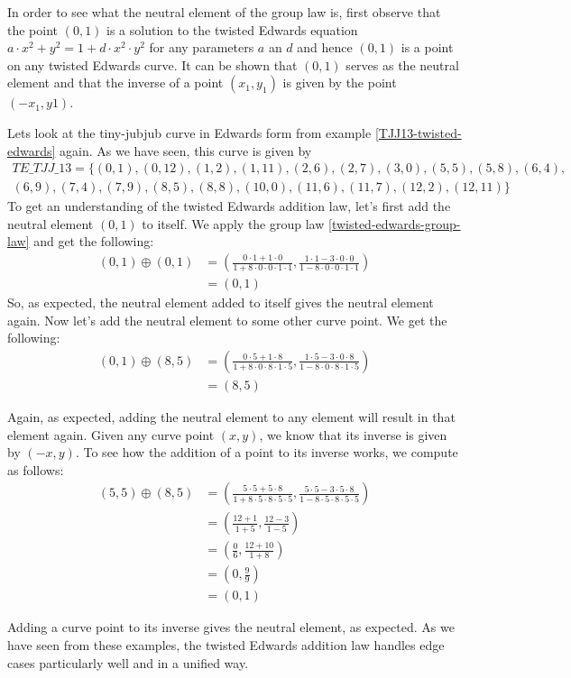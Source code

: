 In order to see what the neutral element of the group law is, first observe that the point $(0,1)$ is a solution to the twisted Edwards equation $a\cdot x^{2} + y^2 =1+ d\cdot x^{2}\cdot y^2$ for any parameters $a$ an $d$ and hence $(0,1)$ is a point on any twisted Edwards curve. It can be shown that $(0,1)$ serves as the neutral element and that the inverse of a point $(x_1, y_1)$ is given by the point $(-x_1, y1)$.
\begin{example}
\label{example:TETJJ13}
 Lets look at the tiny-jubjub curve in Edwards form from example \ref{TJJ13-twisted-edwards} again. As we have seen, this curve is given by
\begin{multline*}
\mathit{TE\_TJJ\_13} = \{(0, 1),(0, 12),(1, 2),(1, 11),(2, 6),(2, 7),(3, 0),(5, 5),(5, 8),(6, 4),\\
(6, 9),(7, 4),(7, 9),(8, 5),(8, 8),(10, 0),(11, 6),(11, 7),(12, 2),(12, 11)\}
\end{multline*}
To get an understanding of the twisted Edwards addition law, let's first add the neutral element $(0,1)$ to itself. We apply the group law \ref{twisted-edwards-group-law} and get the following:
\begin{align*}
(0, 1) \oplus (0, 1) &= \left(\frac{0\cdot 1+1 \cdot 0}{1 +8\cdot0\cdot 0\cdot 1\cdot 1},\frac{1\cdot 1-3\cdot 0\cdot 0}{1-8\cdot 0\cdot 0\cdot 1\cdot 1}\right)\\
                     & = (0,1)
\end{align*}
So, as expected, the neutral element added to itself gives the neutral element again. Now let's add the neutral element to some other curve point. We get the following:
\begin{align*}
(0, 1) \oplus (8, 5) &= \left(\frac{0\cdot 5+1 \cdot 8}{1 +8\cdot0\cdot 8\cdot 1\cdot 5},\frac{1\cdot 5 - 3\cdot 0\cdot 8}{1-8\cdot 0\cdot 8\cdot 1\cdot 5}\right)\\
                     & = (8,5)
\end{align*}

Again, as expected, adding the neutral element to any element will result in that element again. Given any curve point $(x,y)$, we know that its inverse is given by $(-x,y)$. To see how the addition of a point to its inverse works, we compute as follows:
\begin{align*}
(5, 5) \oplus (8, 5) &= \left(\frac{5\cdot 5+5 \cdot 8}{1 +8\cdot 5\cdot 8\cdot 5\cdot 5},\frac{5\cdot 5 - 3\cdot 5\cdot 8}{1-8\cdot 5\cdot 8\cdot 5\cdot 5}\right)\\
                     &= \left(\frac{12+1}{1 +5},\frac{12 - 3}{1-5}\right)\\
                     &= \left(\frac{0}{6},\frac{12 + 10}{1+8}\right)\\
                     &= \left(0,\frac{9}{9}\right)\\
                     &=  (0,1)
\end{align*}

Adding a curve point to its inverse gives the neutral element, as expected. As we have seen from these examples, the twisted Edwards addition law handles edge cases particularly well and in a unified way.
\end{example}

